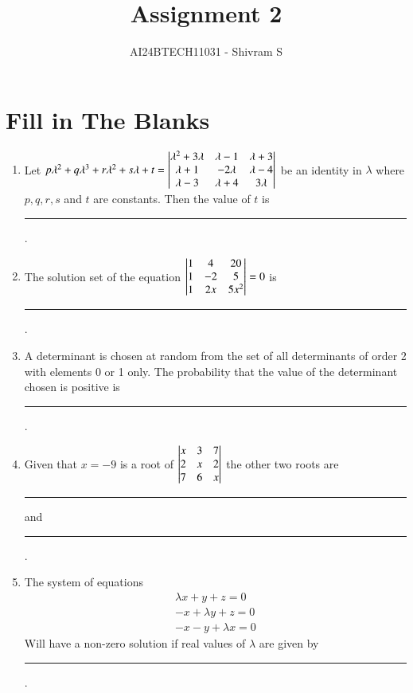 \documentclass[journal,12pt,twocolumn]{IEEEtran}
\theoremstyle{remark}
\begin{document}


\title{Assignment 2}
\author{AI24BTECH11031 - Shivram S}
\maketitle
\newpage
\bigskip

\renewcommand{\thefigure}{\theenumi}
\renewcommand{\thetable}{\theenumi}

\section{Fill in The Blanks}
\begin{enumerate}
	\item Let $p\lambda^2 + q\lambda^3 + r\lambda^2 + s\lambda + t =
		\begin{vmatrix}
			\lambda^2 + 3\lambda & \lambda - 1 & \lambda + 3 \\
			\lambda + 1 & -2\lambda & \lambda - 4 \\
			\lambda - 3 & \lambda+ 4 & 3\lambda
		\end{vmatrix}$ be an identity in $\lambda$ where $p, q, r, s$ and $t$ are constants.
		Then the value of $t$ is \rule{1cm}{0.15mm}.
		\hfill {}
	
	\item The solution set of the equation $\begin{vmatrix}
			1 & 4 & 20 \\
			1 & -2 & 5 \\
			1 & 2x & 5x^2
		\end{vmatrix} = 0$ is \rule{1cm}{0.15mm}.
		\hfill {}

	\item A determinant is chosen at random from the set of all determinants of order
		2 with elements 0 or 1 only. The probability that the value of the determinant
		chosen is positive is \rule{1cm}{0.15mm}.
		\hfill {}

	\item Given that $x = -9$ is a root of $\begin{vmatrix}
			x & 3 & 7 \\
			2 & x & 2 \\
			7 & 6 & x
		\end{vmatrix}$ the other two roots are \rule{1cm}{0.15mm} and \rule{1cm}{0.15mm}.
		\hfill {}

	\item The system of equations
		\begin{gather*}
			\lambda x + y + z = 0 \\
			-x + \lambda y + z = 0 \\
			-x - y + \lambda x = 0
		\end{gather*}
		Will have a non-zero solution if real values of $\lambda$ are given by
		\rule{1cm}{0.15mm}.
		\hfill {}


\end{enumerate}
\end{document}
